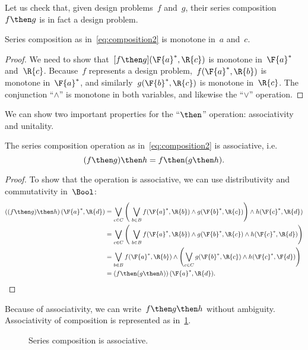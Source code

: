 Let us check that, given design problems~$f$ and~$g$, their series composition~$f\then g$ is in fact a design problem.
\begin{lemma}
    Series composition as in~\cref{eq:composition2} is monotone in~$a$ and~$c$.
\end{lemma}
\begin{proof}
 We need to show that~$[f\then g](\F{a}^*,\R{c})$ is monotone in~$\F{a}^*$ and~$\R{c}$. Because~$f$ represents a design problem,~$f(\F{a}^*,\R{b})$ is monotone in~$\F{a}^*$, and similarly~$g(\F{b}^*,\R{c})$ is monotone in~$\R{c}$. The conjunction ``$\wedge$'' is monotone in both variables, and likewise the ``$\vee$'' operation.
 \end{proof}
 
We can show two important properties for the ``$\then$'' operation: associativity and unitality.
\begin{lemma}
    The series composition operation as in~\cref{eq:composition2} is associative, i.e. 
    \begin{equation}
        (f\then g)\then h = f\then (g\then h).
    \end{equation}
\end{lemma}

\begin{proof}
To show that the operation is associative, we can use distributivity and commutativity in~$\Bool$:
%
\begin{equation}
\begin{aligned}
\left((f\then g) \then h\right) (\F{a}^*,\R{d})
&= \bigvee_{c \in C} \left (\ \bigvee_{b\in B } f(\F{a}^*,\R{b}) \wedge g(\F{b}^*,\R{c}) \right )  \wedge  h (\F{c}^*, \R{d}) \\
&= \bigvee_{c \in C} \left (\ \bigvee_{b\in B } f(\F{a}^*,\R{b})
\wedge g(\F{b}^*,\R{c}) \wedge h (\F{c}^*, \R{d})
    \right ) \\
&= \bigvee_{b \in B } f(\F{a}^*,\R{b}) \wedge \left ( \bigvee_{c\in C} g(\F{b}^*,\R{c}) \wedge h (\F{c}^*, \F{d}) \right ) \\
&= \left(f \then (g \then h )\right) (\F{a}^*, \R{d}).
\end{aligned}
\end{equation}
%
\end{proof}

Because of associativity, we can write~$f\then g\then h$ without ambiguity.
Associativity of composition is represented as in~\cref{fig:compositionassociativity}.

\begin{figure}[h!]
\begin{center}
\end{center}
\caption{Series composition is associative. \label{fig:compositionassociativity}}
\end{figure}

